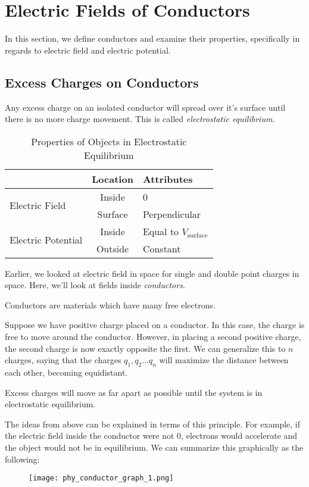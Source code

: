 \documentclass[11pt]{article}
\begin{document}
\section{Electric Fields of Conductors}
In this section, we define conductors and examine their properties, specifically in regards to electric field and electric potential.
\subsection{Excess Charges on Conductors}
Any excess charge on an isolated conductor will spread over it's surface until there is no more charge movement. This is called \textit{electrostatic equilibrium}.

\begin{table}[H]
    \centering
    \begin{tabular}{lcl}
        \toprule
        & Location & Attributes \\ \midrule
        \multirow{2}{*}{Electric Field} & Inside & 0 \\
        & Surface & Perpendicular \\
        \multirow{2}{*}{Electric Potential} & Inside & Equal to $V_{\text{surface}}$ \\
        & Outside & Constant \\ \bottomrule
    \end{tabular}
    \caption{Properties of Objects in Electrostatic Equilibrium}
\end{table}

Earlier, we looked at electric field in space for single and double point charges in space. Here, we'll look at fields inside \textit{conductors}.
\begin{defn}[Conductors]
    Conductors are materials which have many free electrons.
\end{defn}
Suppose we have positive charge placed on a conductor. In this case, the charge is free to move around the conductor. However, in placing a second positive charge, the second charge is now exactly opposite the first. We can generalize this to $n$ charges, saying that the charges $q_1, q_2\dots q_n$ will maximize the distance between each other, becoming equidistant.
\begin{law}
    Excess charges will move as far apart as possible until the system is in electrostatic equilibrium.    
\end{law}
The ideas from above can be explained in terms of this principle. For example, if the electric field inside the conductor were not 0, electrons would accelerate and the object would not be in equilibrium. We can summarize this graphically as the following:
\begin{figure}[H]
    \centering
    \texttt{[image: phy\_conductor\_graph\_1.png]}
\end{figure}
\end{document}
